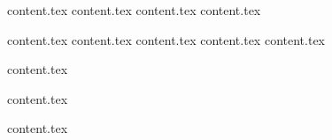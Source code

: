 \documentclass{report}
\begin{document}
    

    \newpage
    \newpage
    
    \titleformat{\chapter}{}{}{0em}{\bf\Huge}

    \afterpage{\blankpage}


    {content.tex}
    {content.tex}
    {content.tex}
    {content.tex}
    

    \tableofcontents


    
    \titleformat{\chapter}[display]{\normalfont\bfseries\Huge}{\chaptertitlename\ \thechapter}{1em}{\bf\Huge}

    \newpage

    {content.tex}
    {content.tex}
    {content.tex}
    {content.tex}
    {content.tex}

    {content.tex}

    {content.tex}

    \printbibliography

    \appendix
    {content.tex}

    \afterpage{\blankpage}

\end{document}
